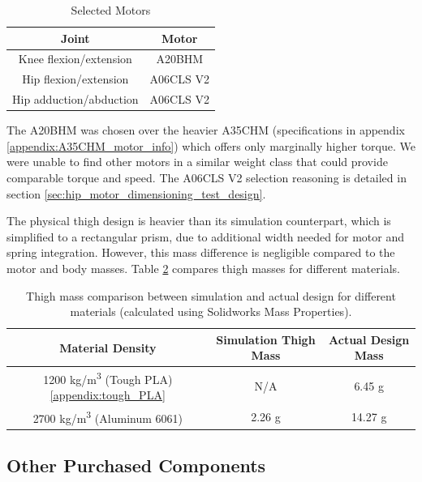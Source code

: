 \begin{table}[h!]
    \centering
    \begin{tabular}{|c|c|}
        \hline
        Joint & Motor\\ \hline
        Knee flexion/extension & A20BHM \\
        Hip flexion/extension & A06CLS V2 \\
        Hip adduction/abduction & A06CLS V2 \\ \hline
    \end{tabular}
    \caption{Selected Motors}
    \label{tab:motor_selection}
\end{table}

The A20BHM was chosen over the heavier A35CHM (specifications in appendix \ref{appendix:A35CHM_motor_info}) which offers only marginally higher torque. We were unable to find other motors in a similar weight class that could provide comparable torque and speed. The A06CLS V2 selection reasoning is detailed in section \ref{sec:hip_motor_dimensioning_test_design}.

The physical thigh design is heavier than its simulation counterpart, which is simplified to a rectangular prism, due to additional width needed for motor and spring integration. However, this mass difference is negligible compared to the motor and body masses. Table \ref{tab:thigh_mass_comparison} compares thigh masses for different materials.

\begin{table}[h!]
    \centering
    \begin{tabular}{|c|c|c|}
        \hline
        Material Density & Simulation Thigh Mass & Actual Design Mass \\ \hline
        1200 kg/m\textsuperscript{3} (Tough PLA) \ref{appendix:tough_PLA} & N/A & 6.45 g \\
        2700 kg/m\textsuperscript{3} (Aluminum 6061) & 2.26 g & 14.27 g \\
        \hline
    \end{tabular}
    \caption{Thigh mass comparison between simulation and actual design for different materials (calculated using Solidworks Mass Properties).}
    \label{tab:thigh_mass_comparison}
\end{table}

\subsection{Other Purchased Components}

